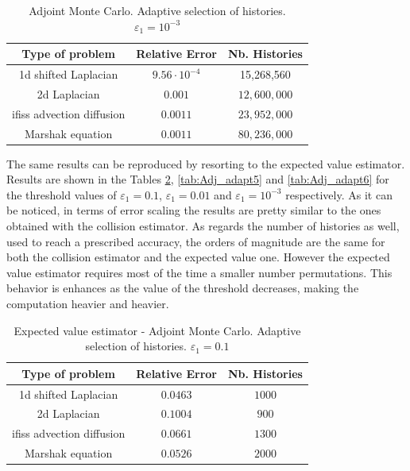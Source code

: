 \begin{table}[!h]
\centering
\begin{tabular}{|c|c|c|}
\hline
\textbf{Type of problem} & \textbf{Relative Error} &\textbf{Nb. Histories}\\
\hline
1d shifted Laplacian & $9.56 \cdot 10^{-4}$ & 15,268,560 \\
\hline
2d Laplacian & $0.001$ & $12,600,000$\\
\hline
ifiss advection diffusion & $0.0011$  & $23,952,000$\\
\hline
Marshak equation & $0.0011$ &  $80,236,000$\\
\hline
\end{tabular}
\caption{Adjoint Monte Carlo. Adaptive selection of histories.
$\varepsilon_1=10^{-3}$}
\label{tab:Adj_adapt3}
\end{table}

The same results can be reproduced by resorting to the expected value
estimator. Results are shown in the Tables \ref{tab:Adj_adapt4},
\ref{tab:Adj_adapt5} and \ref{tab:Adj_adapt6} for the threshold values of
$\varepsilon_1=0.1$, $\varepsilon_1=0.01$ and $\varepsilon_1=10^{-3}$
respectively. As it can be noticed, in terms of error scaling the results are
pretty similar to the ones obtained with the collision estimator. As regards
the number of histories as well, used to reach a prescribed accuracy, the
orders of magnitude are the same for both the collision estimator and the
expected value one. However the expected value estimator requires most of the
time a smaller number permutations. This behavior is enhances as the value of
the threshold decreases, making the computation heavier and heavier.


\begin{table}[!h]
\centering
\begin{tabular}{|c|c|c|}
\hline
\textbf{Type of problem} & \textbf{Relative Error} &\textbf{Nb. Histories}\\
\hline
1d shifted Laplacian & $0.0463$ & $1000$\\
\hline
2d Laplacian & $0.1004$ & $900$\\
\hline
ifiss advection diffusion & $0.0661$  & $1300$\\
\hline
Marshak equation & $0.0526$ & $2000$\\
\hline
\end{tabular}
\caption{Expected value estimator - Adjoint Monte Carlo. Adaptive selection of
histories.
$\varepsilon_1=0.1$}
\label{tab:Adj_adapt4}
\end{table}


